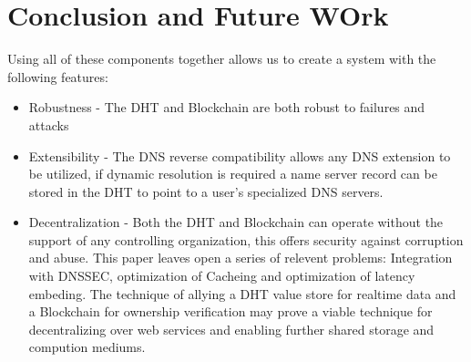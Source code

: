 \documentclass[11pt]{IEEEtran} %
\begin{document}
\section{Conclusion and Future WOrk}
Using all of these components together allows us to create a system with the following features:
\begin{itemize}
	\item Robustness - The DHT and Blockchain are both robust to failures and attacks
	\item Extensibility - The DNS reverse compatibility allows any DNS extension to be utilized, if dynamic resolution is required a name server record can be stored in the DHT to point to a user's specialized DNS servers.
	\item Decentralization - Both the DHT and Blockchain can operate without the support of any controlling organization, this offers security against corruption and abuse.
This paper leaves open a series of relevent problems: Integration with DNSSEC, optimization of Cacheing and optimization of latency embeding. The technique of allying a DHT value store for realtime data and a Blockchain for ownership verification may prove a viable technique for decentralizing over web services and enabling further shared storage and compution mediums.

\end{itemize}	



\end{document}
